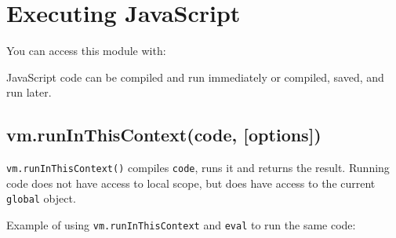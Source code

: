 \section{Executing JavaScript}

\begin{Shaded}
\begin{Highlighting}[]
\NormalTok{: } 
\end{Highlighting}
\end{Shaded}

You can access this module with:

\begin{Shaded}
\begin{Highlighting}[]
 \NormalTok{);}
\end{Highlighting}
\end{Shaded}

JavaScript code can be compiled and run immediately or compiled, saved,
and run later.

\subsection{vm.runInThisContext(code, {[}options{]})}

\texttt{vm.runInThisContext()} compiles \texttt{code}, runs it and
returns the result. Running code does not have access to local scope,
but does have access to the current \texttt{global} object.

Example of using \texttt{vm.runInThisContext} and \texttt{eval} to run
the same code:

\begin{Shaded}
\begin{Highlighting}[]
 \NormalTok{;}

 \NormalTok{(}\NormalTok{);}
\NormalTok{(}
\NormalTok{(}

 \NormalTok{);}
\NormalTok{(}
\NormalTok{(}

\end{Highlighting}
\end{Shaded}


